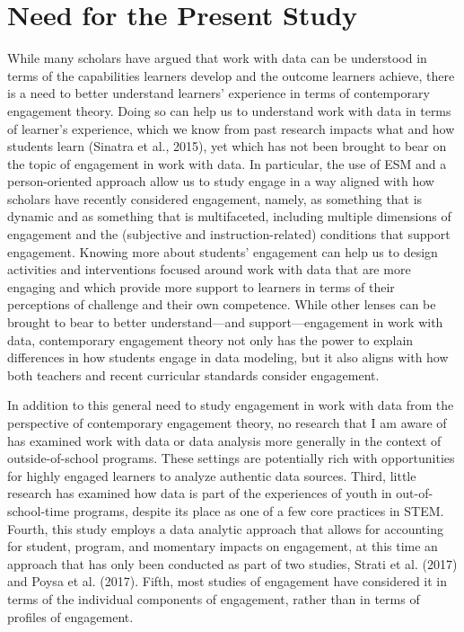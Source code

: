 \documentclass[]{msu-thesis}
\theoremstyle{definition}
\theoremstyle{definition}
\theoremstyle{definition}
\theoremstyle{remark}
\begin{document}
\section{Need for the Present Study}\label{need-for-the-present-study}

While many scholars have argued that work with data can be understood in
terms of the capabilities learners develop and the outcome learners
achieve, there is a need to better understand learners' experience in
terms of contemporary engagement theory. Doing so can help us to
understand work with data in terms of learner's experience, which we
know from past research impacts what and how students learn (Sinatra et
al., 2015), yet which has not been brought to bear on the topic of
engagement in work with data. In particular, the use of ESM and a
person-oriented approach allow us to study engage in a way aligned with
how scholars have recently considered engagement, namely, as something
that is dynamic and as something that is multifaceted, including
multiple dimensions of engagement and the (subjective and
instruction-related) conditions that support engagement. Knowing more
about students' engagement can help us to design activities and
interventions focused around work with data that are more engaging and
which provide more support to learners in terms of their perceptions of
challenge and their own competence. While other lenses can be brought to
bear to better understand---and support---engagement in work with data,
contemporary engagement theory not only has the power to explain
differences in how students engage in data modeling, but it also aligns
with how both teachers and recent curricular standards consider
engagement.

In addition to this general need to study engagement in work with data
from the perspective of contemporary engagement theory, no research that
I am aware of has examined work with data or data analysis more
generally in the context of outside-of-school programs. These settings
are potentially rich with opportunities for highly engaged learners to
analyze authentic data sources. Third, little research has examined how
data is part of the experiences of youth in out-of-school-time programs,
despite its place as one of a few core practices in STEM. Fourth, this
study employs a data analytic approach that allows for accounting for
student, program, and momentary impacts on engagement, at this time an
approach that has only been conducted as part of two studies, Strati et
al. (2017) and Poysa et al. (2017). Fifth, most studies of engagement
have considered it in terms of the individual components of engagement,
rather than in terms of profiles of engagement.
\end{document}
